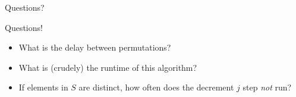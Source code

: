 \documentclass[aspectratio=169]{beamer}
\begin{document}
% 

% 

\begin{frame}{}
      \begin{center}
    {\color{sigma@mainblue} \LARGE Questions?}
  \end{center}
\end{frame}

\begin{frame}{Questions!}
\begin{itemize}
    \item What is the delay between permutations?
    \item What is (crudely) the runtime of this algorithm?
    \item If elements in $S$ are distinct, how often does the decrement $j$ step \textit{not} run?
\end{itemize}
\end{frame}
\end{document}

